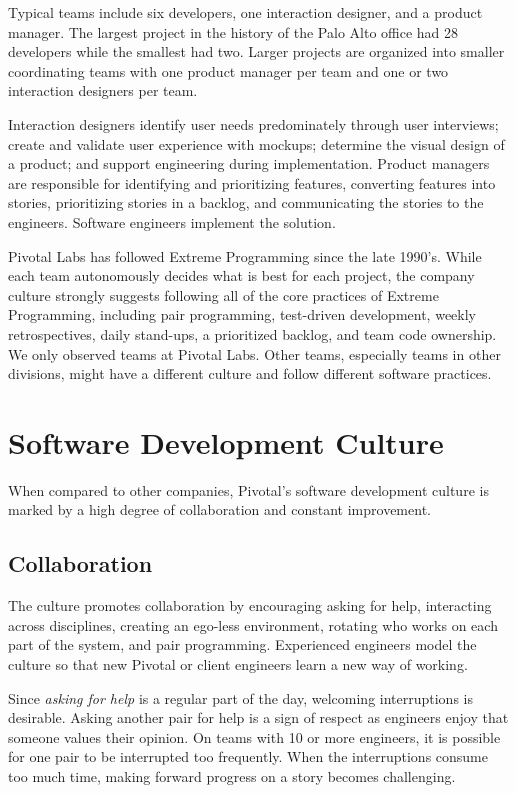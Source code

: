 Typical teams include six developers, one interaction designer, and a product manager. The largest project in the history of the Palo Alto office had 28 developers while the smallest had two. Larger projects are organized into smaller coordinating teams with one product manager per team and one or two interaction designers per team.


Interaction designers identify user needs predominately through user interviews; create and validate user experience with mockups; determine the visual design of a product; and support engineering during implementation. Product managers are responsible for identifying and prioritizing features, converting features into stories, prioritizing stories in a backlog, and communicating the stories to the engineers. Software engineers implement the solution. 


Pivotal Labs has followed Extreme Programming \cite{BeckExtremeProgramming2004} since the late 1990's. While each team autonomously decides what is best for each project, the company culture strongly suggests following all of the core practices of Extreme Programming, including pair programming, test-driven development, weekly retrospectives, daily stand-ups, a prioritized backlog, and team code ownership. We only observed teams at Pivotal Labs. Other teams, especially teams in other divisions, might have a different culture and follow different software practices.


\section{Software Development Culture}
When compared to other companies, Pivotal's software development culture is marked by a high degree of collaboration and constant improvement.


\subsection{Collaboration}
The culture promotes collaboration by encouraging asking for help, interacting across disciplines, creating an ego-less environment, rotating who works on each part of the system, and pair programming. Experienced engineers model the culture so that new Pivotal or client engineers learn a new way of working.


Since \textit{asking for help} is a regular part of the day, welcoming interruptions is desirable. Asking another pair for help is a sign of respect as engineers enjoy that someone values their opinion. On teams with 10 or more engineers, it is possible for one pair to be interrupted too frequently. When the interruptions consume too much time, making forward progress on a story becomes challenging. 


